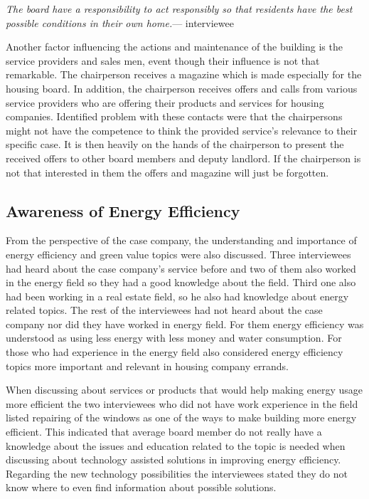\begin{displayquote}
\textit{The board have a responsibility to act responsibly so that residents have the best possible conditions in their own home.}--- interviewee
\end{displayquote}

Another factor influencing the actions and maintenance of the building is the service providers and sales men, event though their influence is not that remarkable. The chairperson receives a magazine which is made especially for the housing board. In addition, the chairperson receives offers and calls from various service providers who are offering their products and services for housing companies. Identified problem with these contacts were that the chairpersons might not have the competence to think the provided service's relevance to their specific case. It is then heavily on the hands of the chairperson to present the received offers to other board members and deputy landlord. If the chairperson is not that interested in them the offers and magazine will just be forgotten.

\subsection{Awareness of Energy Efficiency}

From the perspective of the case company, the understanding and importance of  energy efficiency and green value topics were also discussed. Three interviewees had heard about the case company's service before and two of them also worked in the energy field so they had a good knowledge about the field. Third one also had been working in a real estate field, so he also had knowledge about energy related topics. The rest of the interviewees had not heard about the case company nor did they have worked in energy field. For them energy efficiency was understood as using less energy with less money and water consumption. For those who had experience in the energy field also considered energy efficiency topics more important and relevant in housing company errands.

When discussing about services or products that would help making energy usage more efficient the two interviewees who did not have work experience in the field listed repairing of the windows as one of the ways to make building more energy efficient. This indicated that average board member do not really have a knowledge about the issues and education related to the topic is needed when discussing about technology assisted solutions in improving energy efficiency. Regarding the new technology possibilities the interviewees stated they do not know where to even find information about possible solutions.

